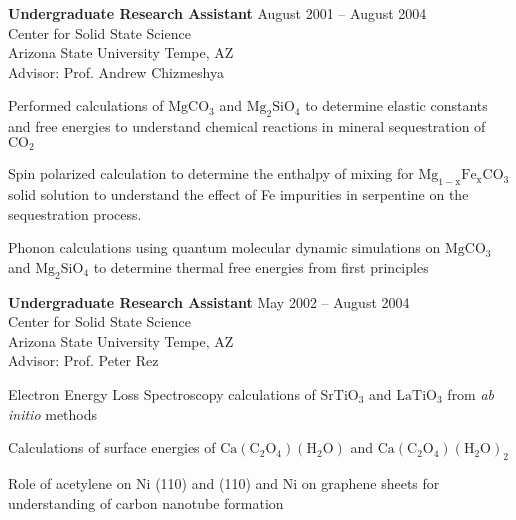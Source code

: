 \documentclass[margin,line]{resume}
\begin{document}
\begin{resume}
    \newpage


		\textbf{Undergraduate Research Assistant} \hfill August 2001 -- August 2004\vspace{1mm}\\
		Center for Solid State Science\\
Arizona State University Tempe, AZ\\
Advisor: Prof. Andrew Chizmeshya\\\vspace{-1.5mm}
		\begin{list2}
			\item Performed calculations of $\mathrm{MgCO_3}$ and $\mathrm{Mg_2SiO_4}$ to determine elastic constants and free energies to understand chemical reactions in mineral sequestration of $\mathrm{CO_2}$
		 \item Spin polarized calculation to determine the enthalpy of mixing for $\mathrm{Mg_{1-x}Fe_{x}CO_{3}}$ solid solution to understand the effect of Fe impurities in serpentine on the sequestration process.
		 \item Phonon calculations using quantum molecular dynamic simulations on $\mathrm{MgCO_3}$ and $\mathrm{Mg_2SiO_4}$ to determine thermal free energies from first principles
		\end{list2}
		
		\textbf{Undergraduate Research Assistant} \hfill May 2002 – August 2004\vspace{1mm}\\
		Center for Solid State Science\\
Arizona State University Tempe, AZ\\
Advisor: Prof. Peter Rez\\\vspace{-1.5mm}
		\begin{list2}
			\item Electron Energy Loss Spectroscopy calculations of $\mathrm{SrTiO_3}$ and $\mathrm{LaTiO_3}$ from \textsl{ab initio} methods
			\item Calculations of surface energies of $\mathrm{Ca(C_2O_4)(H_2O)}$ and $\mathrm{Ca(C_2O_4)(H_2O)_2}$
			\item Role of acetylene on Ni (110) and (110) and Ni on graphene sheets for understanding of carbon nanotube formation
		\end{list2}
		

\end{resume}
\end{document}
